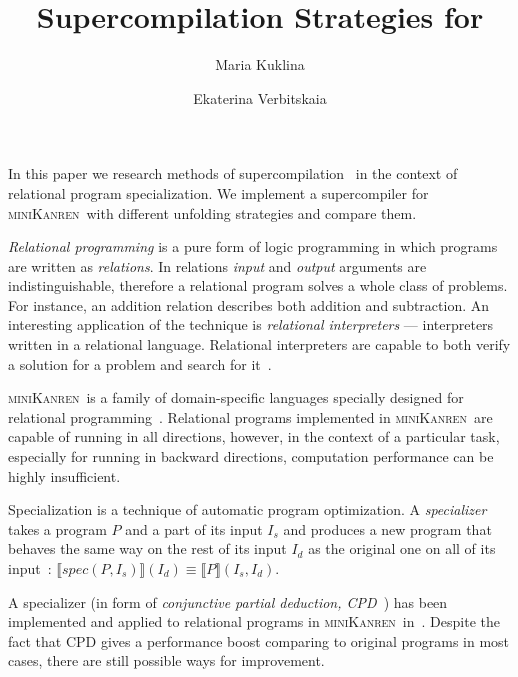 \documentclass[submission,copyright,creativecommons]{eptcs}
\title{Supercompilation Strategies for \miniKanren}
\author{Maria Kuklina
\institute{ITMO University\\ Saint Petersburg, Russia}
\email{kuklina.md@gmail.com}
\and
Ekaterina Verbitskaia
\institute{JetBrains Research\\
Saint Petersburg, Russia}
\email{kajigor@gmail.com}
}
\newcommand{\miniKanren}{\textsc{miniKanren}\ }
\begin{document}
\maketitle


In this paper we research methods of supercompilation~\cite{introSC} in the context of relational program specialization.
We implement a supercompiler for \miniKanren with different unfolding strategies and compare them.



{\it Relational programming} is a pure form of logic programming in which programs are
written as {\it relations}. In relations {\it input} and {\it output} arguments are indistinguishable,
therefore a relational program solves a whole class of problems.
For instance, an addition relation describes both addition and subtraction.
An interesting application of the technique is {\it relational interpreters} --- interpreters written in a relational language.
Relational interpreters are capable to both verify a solution for a problem and search for it~\cite{lozov2019}.

\miniKanren is a family of domain-specific languages specially designed for relational programming~\cite{friedmanSchemer}.
Relational programs implemented in \miniKanren are capable of running in all directions, however, in the context of a particular
task, especially for running in backward directions, computation performance can be highly insufficient.

Specialization is a technique of automatic program optimization. A {\it specializer} takes a program $P$ and a part
of its input $I_s$ and produces a new program that behaves the same way on the rest of its input $I_d$ as the original
one on all of its input~\cite{jones1993partial}:
$\llbracket spec(P, I_s) \rrbracket (I_d) \equiv \llbracket P \rrbracket (I_s, I_d)$.

A specializer (in form of {\it conjunctive partial deduction, CPD}~\cite{cpd}) has been implemented and applied to
relational programs in \miniKanren in~\cite{lozov2019}. Despite the fact that CPD gives a performance boost
comparing to original programs in most cases, %
there are still possible ways for improvement.
\end{document}
